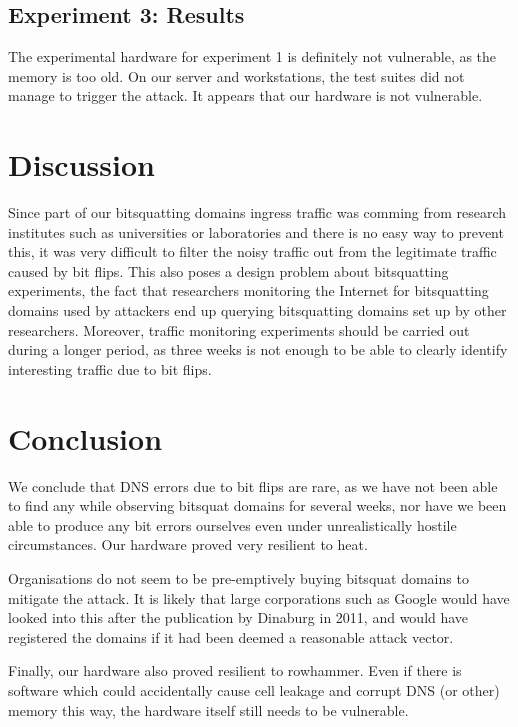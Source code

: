 \documentclass[conference]{IEEEtran}
\begin{document}
\subsection{Experiment 3: Results}

The experimental hardware for experiment 1 is definitely not vulnerable, as the
memory is too old. On our server and workstations, the test suites did not
manage to trigger the attack. It appears that our hardware is not vulnerable.



\section{Discussion}\label{sec:disc}

Since part of our bitsquatting domains ingress traffic was comming from
research institutes such as universities or laboratories and there is no easy
way to prevent this, it was very difficult to filter the noisy traffic out from
the legitimate traffic caused by bit flips. This also poses a design problem
about bitsquatting experiments, the fact that researchers monitoring the
Internet for bitsquatting domains used by attackers end up querying
bitsquatting domains set up by other researchers. Moreover, traffic monitoring
experiments should be carried out during a longer period, as three weeks is not
enough to be able to clearly identify interesting traffic due to bit flips.


\section{Conclusion}\label{sec:conc}

We conclude that DNS errors due to bit flips are rare, as we have not been able
to find any while observing bitsquat domains for several weeks, nor have we
been able to produce any bit errors ourselves even under unrealistically
hostile circumstances. Our hardware proved very resilient to heat.

Organisations do not seem to be pre-emptively buying bitsquat domains to
mitigate the attack. It is likely that large corporations such as Google would
have looked into this after the publication by Dinaburg in 2011, and would have
registered the domains if it had been deemed a reasonable attack vector.

Finally, our hardware also proved resilient to rowhammer. Even if there is
software which could accidentally cause cell leakage and corrupt DNS (or other)
memory this way, the hardware itself still needs to be vulnerable.
\end{document}
